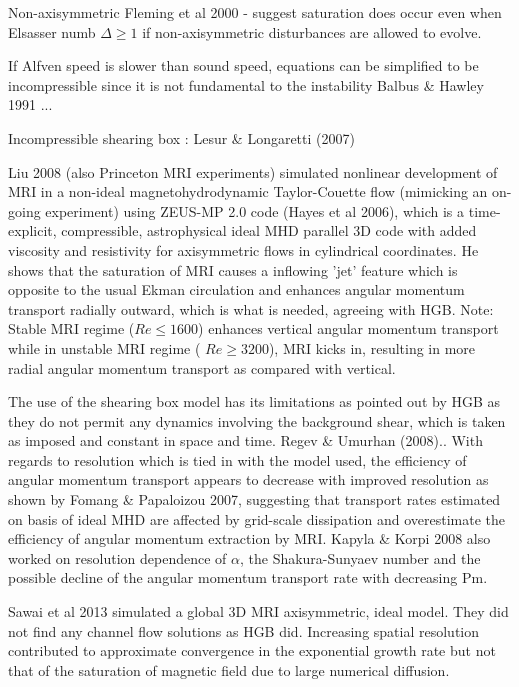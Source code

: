 \documentclass{jfm}
\begin{document}
Non-axisymmetric Fleming et al 2000 \cite{Fleming2000} - suggest saturation does occur even when Elsasser numb $\Delta \ge 1$ if non-axisymmetric disturbances are allowed to evolve.

If Alfven speed is slower than sound speed, equations can be simplified to be incompressible since it is not fundamental to the instability Balbus \& Hawley 1991 \cite{Balbus1991} ...

Incompressible shearing box : Lesur \& Longaretti (2007) \cite{Lesur2007}

Liu 2008 \cite{Liu2008} (also Princeton MRI experiments) simulated nonlinear development of MRI in a non-ideal magnetohydrodynamic Taylor-Couette flow (mimicking an on-going experiment) using ZEUS-MP 2.0 code (Hayes et al 2006), which is a time-explicit, compressible, astrophysical ideal MHD parallel 3D code with added viscosity and resistivity for axisymmetric flows in cylindrical coordinates. He shows that the saturation of MRI causes a inflowing 'jet' feature which is opposite to the usual Ekman circulation and enhances angular momentum transport radially outward, which is what is needed, agreeing with HGB. Note: Stable MRI regime ($ Re \le 1600$) enhances vertical angular momentum transport while in unstable MRI regime ( $ Re \ge 3200$), MRI kicks in, resulting in more radial angular momentum transport as compared with vertical.

The use of the shearing box model has its limitations as pointed out by HGB as they do not permit any dynamics involving the background shear, which is taken as imposed and constant in space and time. Regev \& Umurhan (2008).. With regards to resolution which is tied in with the model used, the efficiency of angular momentum transport appears to decrease with improved resolution as shown by Fomang \& Papaloizou 2007, suggesting that transport rates estimated on basis of ideal MHD are affected by grid-scale dissipation and overestimate the efficiency of angular momentum extraction by MRI. Kapyla \& Korpi 2008 \cite{Kapyla2008} also worked on resolution dependence of $\alpha$, the Shakura-Sunyaev number and the possible decline of the angular momentum transport rate with decreasing Pm.

Sawai et al 2013 \cite{Sawai2013} simulated a global 3D MRI axisymmetric, ideal model. They did not find any channel flow solutions as HGB did. Increasing spatial resolution contributed to approximate convergence in the exponential growth rate but not that of the saturation of magnetic field due to large numerical diffusion.
\end{document}
